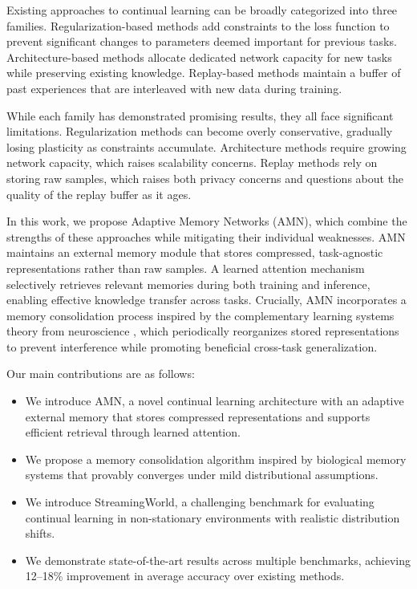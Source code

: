 \documentclass[11pt]{article}
\begin{document}
Existing approaches to continual learning can be broadly categorized into three families. Regularization-based methods \citep{kirkpatrick2017overcoming, zenke2017continual, aljundi2018memory} add constraints to the loss function to prevent significant changes to parameters deemed important for previous tasks. Architecture-based methods \citep{rusu2016progressive, yoon2018lifelong, li2019learn} allocate dedicated network capacity for new tasks while preserving existing knowledge. Replay-based methods \citep{rebuffi2017icarl, shin2017continual, rolnick2019experience} maintain a buffer of past experiences that are interleaved with new data during training.

While each family has demonstrated promising results, they all face significant limitations. Regularization methods can become overly conservative, gradually losing plasticity as constraints accumulate. Architecture methods require growing network capacity, which raises scalability concerns. Replay methods rely on storing raw samples, which raises both privacy concerns and questions about the quality of the replay buffer as it ages.

In this work, we propose Adaptive Memory Networks (AMN), which combine the strengths of these approaches while mitigating their individual weaknesses. AMN maintains an external memory module that stores compressed, task-agnostic representations rather than raw samples. A learned attention mechanism selectively retrieves relevant memories during both training and inference, enabling effective knowledge transfer across tasks. Crucially, AMN incorporates a memory consolidation process inspired by the complementary learning systems theory from neuroscience \citep{mcclelland1995there, kumaran2016learning}, which periodically reorganizes stored representations to prevent interference while promoting beneficial cross-task generalization.

Our main contributions are as follows:
\begin{itemize}
    \item We introduce AMN, a novel continual learning architecture with an adaptive external memory that stores compressed representations and supports efficient retrieval through learned attention.
    \item We propose a memory consolidation algorithm inspired by biological memory systems that provably converges under mild distributional assumptions.
    \item We introduce StreamingWorld, a challenging benchmark for evaluating continual learning in non-stationary environments with realistic distribution shifts.
    \item We demonstrate state-of-the-art results across multiple benchmarks, achieving 12--18\% improvement in average accuracy over existing methods.
\end{itemize}
\end{document}

